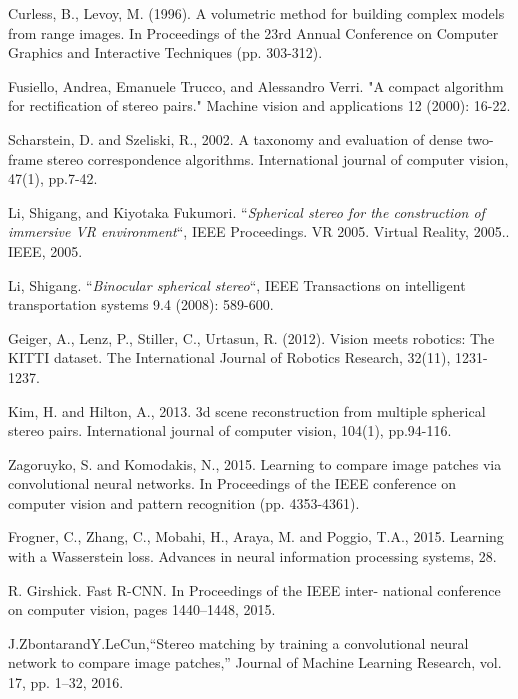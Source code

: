 \documentclass[english, LaM, oneside]{sapthesis}%
\begin{document}
\begin{thebibliography}{99}

 Curless, B., Levoy, M. (1996). A volumetric method for building complex models from range images. In Proceedings of the 23rd Annual Conference on Computer Graphics and Interactive Techniques (pp. 303-312).

 Fusiello, Andrea, Emanuele Trucco, and Alessandro Verri. "A compact algorithm for rectification of stereo pairs." Machine vision and applications 12 (2000): 16-22.

Scharstein, D. and Szeliski, R., 2002. A taxonomy and evaluation of dense two-frame stereo correspondence algorithms. International journal of computer vision, 47(1), pp.7-42.

Li, Shigang, and Kiyotaka Fukumori. “\textit{Spherical stereo for the construction of immersive VR environment}“, IEEE Proceedings. VR 2005. Virtual Reality, 2005.. IEEE, 2005.

Li, Shigang. “\textit{Binocular spherical stereo}“, IEEE Transactions on intelligent transportation systems 9.4 (2008): 589-600.




 Geiger, A., Lenz, P., Stiller, C., Urtasun, R. (2012). Vision meets robotics: The KITTI dataset. The International Journal of Robotics Research, 32(11), 1231-1237.


 Kim, H. and Hilton, A., 2013. 3d scene reconstruction from multiple spherical stereo pairs. International journal of computer vision, 104(1), pp.94-116.

Zagoruyko, S. and Komodakis, N., 2015. Learning to compare image patches via convolutional neural networks. In Proceedings of the IEEE conference on computer vision and pattern recognition (pp. 4353-4361).

Frogner, C., Zhang, C., Mobahi, H., Araya, M. and Poggio, T.A., 2015. Learning with a Wasserstein loss. Advances in neural information processing systems, 28.

R. Girshick. Fast R-CNN. In Proceedings of the IEEE inter- national conference on computer vision, pages 1440–1448, 2015.

J.ZbontarandY.LeCun,“Stereo matching by training a convolutional neural network to compare image patches,” Journal of Machine Learning Research, vol. 17, pp. 1–32, 2016. 




\end{thebibliography}
\end{document}
